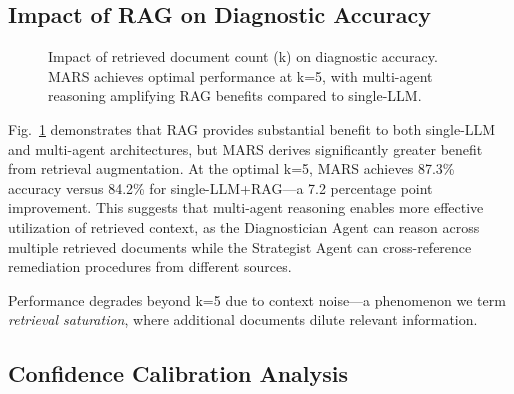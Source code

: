 \documentclass[journal]{IEEEtran}
\begin{document}
\subsection{Impact of RAG on Diagnostic Accuracy}

\begin{figure}[t]
\centering
{}
\caption{Impact of retrieved document count (k) on diagnostic accuracy. MARS achieves optimal performance at k=5, with multi-agent reasoning amplifying RAG benefits compared to single-LLM.}
\label{fig:rag_impact}
\end{figure}

Fig.~\ref{fig:rag_impact} demonstrates that RAG provides substantial benefit to both single-LLM and multi-agent architectures, but MARS derives significantly greater benefit from retrieval augmentation. At the optimal k=5, MARS achieves 87.3\% accuracy versus 84.2\% for single-LLM+RAG—a 7.2 percentage point improvement. This suggests that multi-agent reasoning enables more effective utilization of retrieved context, as the Diagnostician Agent can reason across multiple retrieved documents while the Strategist Agent can cross-reference remediation procedures from different sources.

Performance degrades beyond k=5 due to context noise—a phenomenon we term \textit{retrieval saturation}, where additional documents dilute relevant information.

\subsection{Confidence Calibration Analysis}
\end{document}
